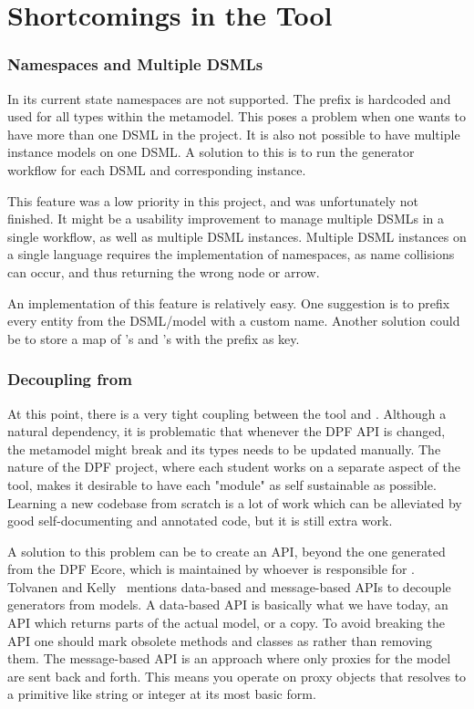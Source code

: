 \section{Shortcomings in the Tool}\label{sec:shortcomings}
\subsubsection{Namespaces and Multiple DSMLs}\label{subsub:namespaces}
In its current state namespaces are not supported. The prefix  is hardcoded and used for all types within the metamodel. This poses a problem when one wants to have more than one DSML in the project. It is also not possible to have multiple instance models on one DSML. A solution to this is to run the generator workflow for each DSML and corresponding instance.

This feature was a low priority in this project, and was unfortunately not finished. It might be a usability improvement to manage multiple DSMLs in a single workflow, as well as multiple DSML instances. Multiple DSML instances on a single language requires the implementation of namespaces, as name collisions can occur, and thus returning the wrong node or arrow.

An implementation of this feature is relatively easy. One suggestion is to prefix every entity from the DSML/model with a custom name. Another solution could be to store a map of 's and 's with the prefix as key.

\subsubsection{Decoupling from }\label{subsub:decouple}
At this point, there is a very tight coupling between the tool and . Although a natural dependency, it is problematic that whenever the DPF API is changed, the metamodel might break and its types needs to be updated manually. The nature of the DPF project, where each student works on a separate aspect of the tool, makes it desirable to have each "module" as self sustainable as possible. Learning a new codebase from scratch is a lot of work which can be alleviated by good self-documenting and annotated code, but it is still extra work.

A solution to this problem can be to create an API, beyond the one generated from the DPF Ecore, which is maintained by whoever is responsible for . Tolvanen and Kelly~\cite{tolvanen:dsm} mentions data-based and message-based APIs to decouple generators from models. A data-based API is basically what we have today, an API which returns parts of the actual model, or a copy. To avoid breaking the API one should mark obsolete methods and classes as  rather than removing them. The message-based API is an approach where only proxies for the model are sent back and forth. This means you operate on proxy objects that resolves to a primitive like string or integer at its most basic form.

